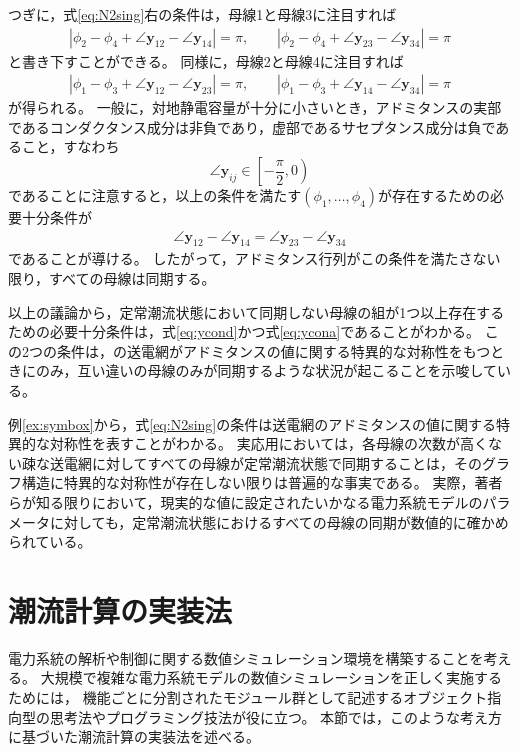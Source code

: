 \documentclass[tombow,dvipdfmx]{corona-a5-1.1}
\begin{document}
\begin{例}
つぎに，式\ref{eq:N2sing}右の条件は，母線1と母線3に注目すれば
\begin{align*}
|\phi_2 - \phi_4 + \angle \bm{y}_{12} - \angle \bm{y}_{14}|=\pi
,\qquad
|\phi_2 - \phi_4 + \angle \bm{y}_{23} - \angle \bm{y}_{34}|=\pi
\end{align*}
と書き下すことができる。
同様に，母線2と母線4に注目すれば
\begin{align*}
|\phi_1 - \phi_3 + \angle \bm{y}_{12} - \angle \bm{y}_{23}|=\pi
,\qquad
|\phi_1 - \phi_3 + \angle \bm{y}_{14} - \angle \bm{y}_{34}|=\pi
\end{align*}
が得られる。
一般に，対地静電容量が十分に小さいとき，アドミタンスの実部であるコンダクタンス成分は非負であり，虚部であるサセプタンス成分は負であること，すなわち
\[
\angle \bm{y}_{ij} \in \left[-\frac{\pi}{2},0 \right)
\]
であることに注意すると，以上の条件を満たす$(\phi_1,\ldots,\phi_4)$が存在するための必要十分条件が
\begin{align}\label{eq:ycona}
\angle \bm{y}_{12} - \angle \bm{y}_{14}=
\angle \bm{y}_{23} - \angle \bm{y}_{34}
\end{align}
であることが導ける。
したがって，アドミタンス行列がこの条件を満たさない限り，すべての母線は同期する。

以上の議論から，定常潮流状態において同期しない母線の組が1つ以上存在するための必要十分条件は，式\ref{eq:ycond}かつ式\ref{eq:ycona}であることがわかる。
この2つの条件は，の送電網がアドミタンスの値に関する特異的な対称性をもつときにのみ，互い違いの母線のみが同期するような状況が起こることを示唆している。
\end{例}

例\ref{ex:symbox}から，式\ref{eq:N2sing}の条件は送電網のアドミタンスの値に関する特異的な対称性を表すことがわかる。
実応用においては，各母線の次数が高くない疎な送電網に対してすべての母線が定常潮流状態で同期することは，そのグラフ構造に特異的な対称性が存在しない限りは普遍的な事実である。
実際，著者らが知る限りにおいて，現実的な値に設定されたいかなる電力系統モデルのパラメータに対しても，定常潮流状態におけるすべての母線の同期が数値的に確かめられている。

\section{潮流計算の実装法}\label{sec:powfcal}

電力系統の解析や制御に関する数値シミュレーション環境を構築することを考える。
大規模で複雑な電力系統モデルの数値シミュレーションを正しく実施するためには，
機能ごとに分割されたモジュール群として記述するオブジェクト指向型の思考法やプログラミング技法が役に立つ。
本節では，このような考え方に基づいた潮流計算の実装法を述べる。
\end{document}
